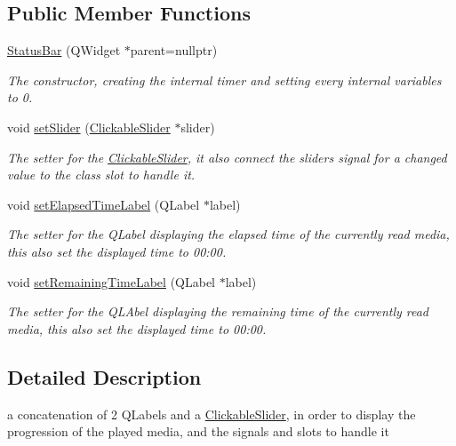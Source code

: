 \subsection*{Public Member Functions}
\begin{DoxyCompactItemize}
\item 
\hyperlink{classStatusBar_a51d704471d7c6b35567bf325bea87cfa}{Status\+Bar} (Q\+Widget $\ast$parent=nullptr)
\begin{DoxyCompactList}\small\item\em The constructor, creating the internal timer and setting every internal variables to 0. \end{DoxyCompactList}\item 
void \hyperlink{classStatusBar_aec9c453a499cd3737f7dd24903aae133}{set\+Slider} (\hyperlink{classClickableSlider}{Clickable\+Slider} $\ast$slider)
\begin{DoxyCompactList}\small\item\em The setter for the \hyperlink{classClickableSlider}{Clickable\+Slider}, it also connect the slider\textquotesingle{}s signal for a changed value to the class slot to handle it. \end{DoxyCompactList}\item 
void \hyperlink{classStatusBar_a285ff0279e3f9d5b677d83ce236f6d25}{set\+Elapsed\+Time\+Label} (Q\+Label $\ast$label)
\begin{DoxyCompactList}\small\item\em The setter for the Q\+Label displaying the elapsed time of the currently read media, this also set the displayed time to 00\+:00. \end{DoxyCompactList}\item 
void \hyperlink{classStatusBar_af8e70f7ce434b29b04a5aaced2dd05ae}{set\+Remaining\+Time\+Label} (Q\+Label $\ast$label)
\begin{DoxyCompactList}\small\item\em The setter for the Q\+L\+Abel displaying the remaining time of the currently read media, this also set the displayed time to 00\+:00. \end{DoxyCompactList}\end{DoxyCompactItemize}


\subsection{Detailed Description}
a concatenation of 2 Q\+Labels and a \hyperlink{classClickableSlider}{Clickable\+Slider}, in order to display the progression of the played media, and the signals and slots to handle it 

